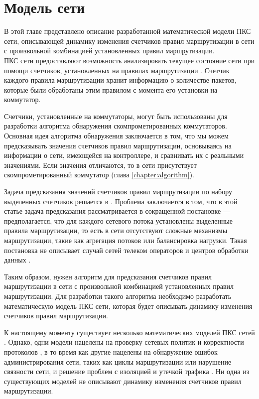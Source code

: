 \documentclass[../thesis.tex]{subfiles}
\begin{document}
\chapter{Модель сети} \label{chapter:model}

В этой главе представлено описание разработанной математической модели ПКС сети, описывающей динамику изменения счетчиков правил маршрутизации в сети с произвольной комбинацией установленных правил маршрутизации.
\\

ПКС сети предоставляют возможность анализировать текущее состояние сети при помощи счетчиков, установленных на правилах маршрутизации \cite{petrov2018mathematical, petrov2018forwarding}.
Счетчик каждого правила маршрутизации хранит информацию о количестве пакетов, которые были обработаны этим правилом с момента его установки на коммутатор.

Счетчики, установленные на коммутаторы, могут быть использованы для разработки алгоритма обнаружения скомпрометированных коммутаторов.
Основная идея алгоритма обнаружения заключается в том, что мы можем предсказывать значения счетчиков правил маршрутизации, основываясь на информации о сети, имеющейся на контроллере, и сравнивать их с реальными значениями.
Если значения отличаются, то в сети присутствует скомпрометированный коммутатор (глава \ref{chapter:algorithm}).

Задача предсказания значений счетчиков правил маршрутизации по набору выделенных счетчиков решается в \cite{tootoonchian2010opentm}.
Проблема заключается в том, что в этой статье задача предсказания рассматривается в сокращенной постановке --- предполагается, что для каждого сетевого потока установлены выделенные правила маршрутизации, то есть в сети отсутствуют сложные механизмы маршрутизации, такие как агрегация потоков или балансировка нагрузки.
Такая постановка не описывает случай сетей телеком операторов и центров обработки данных \cite{kreutz2015software}.

Таким образом, нужен алгоритм для предсказания счетчиков правил маршрутизации в сети с произвольной комбинацией установленных правил маршрутизации.
Для разработки такого алгоритма необходимо разработать математическую модель ПКС сети, которая будет описывать динамику изменения счетчиков правил маршрутизации.

К настоящему моменту существует несколько математических моделей ПКС сетей \cite{kazemian2012header, gutz2012splendid, khurshid2012veriflow, zakharov2014formal, yang2016real, kazemian2013real}.
Однако, одни модели нацелены на проверку сетевых политик и корректности протоколов \cite{gutz2012splendid, khurshid2012veriflow, zakharov2014formal, yang2016real}, в то время как другие нацелены на обнаружение ошибок администрирования сети, таких как циклы маршрутизации или нарушение связности сети, и решение проблем с изоляцией и утечкой трафика \cite{kazemian2012header, kazemian2013real}.
Ни одна из существующих моделей не описывают динамику изменения счетчиков правил маршрутизации.
\end{document}
